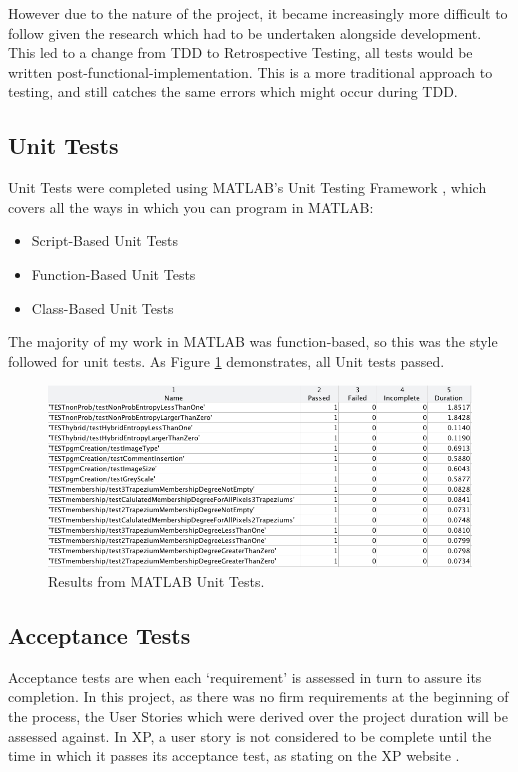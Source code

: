 However due to the nature of the project, it became increasingly more difficult to follow given the research which had to be undertaken alongside development. This led to a change from \acrshort{TDD} to Retrospective Testing, all tests would be written post-functional-implementation. This is a more traditional approach to testing, and still catches the same errors which might occur during \acrshort{TDD}.

\subsection{Unit Tests}

Unit Tests were completed using MATLAB's Unit Testing Framework \cite{testing}, which covers all the ways in which you can program in MATLAB:

\begin{itemize}
  \item Script-Based Unit Tests
  \item Function-Based Unit Tests
  \item Class-Based Unit Tests
  \end{itemize}

The majority of my work in MATLAB was function-based, so this was the style followed for unit tests. As Figure \ref{fig:unit-test-results} demonstrates, all Unit tests passed.

\begin{figure}[H]
  \centering
  \includegraphics[width=\textwidth]{Chapter2/software-img/test-results.png}
  \caption{Results from MATLAB Unit Tests.}
  \label{fig:unit-test-results}
\end{figure}

\subsection{Acceptance Tests}

Acceptance tests are when each `requirement' is assessed in turn to assure its completion. In this project, as there was no firm requirements at the beginning of the process, the User Stories which were derived over the project duration will be assessed against. In \acrfull{XP}, a user story is not considered to be complete until the time in which it passes its acceptance test, as stating on the \acrshort{XP} website \cite{Acceptance_Tests}.


